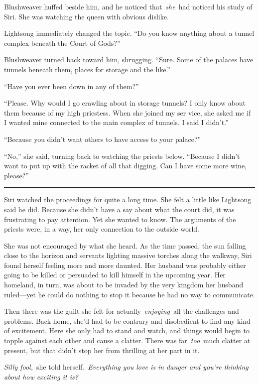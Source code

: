 Blushweaver huffed beside him, and he noticed that~\textit{she}~had noticed his study of Siri. She was watching the queen with obvious dislike.

Lightsong immediately changed the topic. “Do you know anything about a tunnel complex beneath the Court of Gods?”

Blushweaver turned back toward him, shrugging. “Sure. Some of the palaces have tunnels beneath them, places for storage and the like.”

“Have you ever been down in any of them?”

“Please. Why would I go crawling about in storage tunnels? I only know about them because of my high priestess. When she joined my ser vice, she asked me if I wanted mine connected to the main complex of tunnels. I said I didn’t.”

“Because you didn’t want others to have access to your palace?”

“No,” she said, turning back to watching the priests below. “Because I didn’t want to put up with the racket of all that digging. Can I have some more wine, please?”

\bigskip \hrule \bigskip

Siri watched the proceedings for quite a long time. She felt a little like Lightsong said he did. Because she didn’t have a say about what the court did, it was frustrating to pay attention. Yet she wanted to know. The arguments of the priests were, in a way, her only connection to the outside world.

She was not encouraged by what she heard. As the time passed, the sun falling close to the horizon and servants lighting massive torches along the walkway, Siri found herself feeling more and more daunted. Her husband was probably either going to be killed or persuaded to kill himself in the upcoming year. Her homeland, in turn, was about to be invaded by the very kingdom her husband ruled—yet he could do nothing to stop it because he had no way to communicate.

Then there was the guilt she felt for actually~\textit{enjoying}~all the challenges and problems. Back home, she’d had to be contrary and disobedient to find any kind of excitement. Here she only had to stand and watch, and things would begin to topple against each other and cause a clatter. There was far~\textit{too}~much clatter at present, but that didn’t stop her from thrilling at her part in it.

\textit{Silly fool,}~she told herself.~\textit{Everything you love is in danger and you’re thinking about how exciting it is?}

